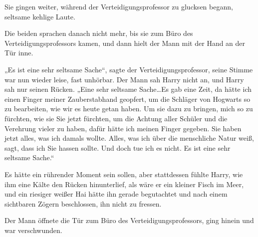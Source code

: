 Sie gingen weiter, während der Verteidigungsprofessor zu glucksen begann, seltsame kehlige Laute.

Die beiden sprachen danach nicht mehr, bis sie zum Büro des Verteidigungsprofessors kamen, und dann hielt der Mann mit der Hand an der Tür inne.

„Es ist eine sehr seltsame Sache“, sagte der Verteidigungsprofessor, seine Stimme war nun wieder leise, fast unhörbar. Der Mann sah Harry nicht an, und Harry sah nur seinen Rücken.
„Eine sehr seltsame Sache…Es gab eine Zeit, da hätte ich einen Finger meiner Zauberstabhand geopfert, um die Schläger von Hogwarts so zu bearbeiten, wie wir es heute getan haben. Um sie dazu zu bringen, mich so zu fürchten, wie sie Sie jetzt fürchten, um die Achtung aller Schüler und die Verehrung vieler zu haben, dafür hätte ich meinen Finger gegeben. Sie haben jetzt alles, was ich damals wollte. Alles, was ich über die menschliche Natur weiß, sagt, dass ich Sie hassen sollte. Und doch tue ich es nicht. Es ist eine sehr seltsame Sache.“

Es hätte ein rührender Moment sein sollen, aber stattdessen fühlte Harry, wie ihm eine Kälte den Rücken hinunterlief, als wäre er ein kleiner Fisch im Meer, und ein riesiger weißer Hai hätte ihn gerade begutachtet und nach einem sichtbaren Zögern beschlossen, ihn nicht zu fressen.

Der Mann öffnete die Tür zum Büro des Verteidigungsprofessors, ging hinein und war verschwunden.

